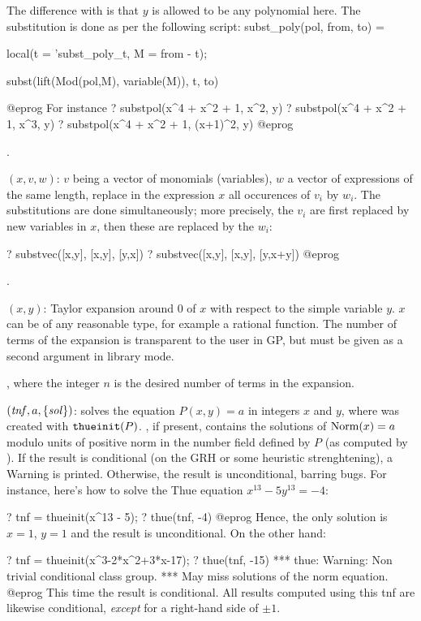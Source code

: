 The difference with  is that $y$ is allowed to be any polynomial
here. The substitution is done as per the following script:
\bprog
   subst_poly(pol, from, to) =
   { local(t = 'subst_poly_t, M = from - t);

     subst(lift(Mod(pol,M), variable(M)), t, to)
   }
@eprog\noindent
For instance
\bprog
? substpol(x^4 + x^2 + 1, x^2, y)
? substpol(x^4 + x^2 + 1, x^3, y)
? substpol(x^4 + x^2 + 1, (x+1)^2, y)
@eprog

.

$(x,v,w)$: $v$ being a vector of monomials (variables),
$w$ a vector of expressions of the same length, replace in the expression
$x$ all occurences of $v_i$ by $w_i$. The substitutions are done
simultaneously; more precisely, the $v_i$ are first replaced by new
variables in $x$, then these are replaced by the $w_i$:

\bprog
? substvec([x,y], [x,y], [y,x])
? substvec([x,y], [x,y], [y,x+y])
@eprog

.

$(x,y)$: Taylor expansion around $0$ of $x$ with respect
to\label{se:taylor}
the simple variable $y$. $x$ can be of any reasonable type, for example a
rational function. The number of terms of the expansion is transparent to the
user in GP, but must be given as a second argument in library mode.

, where the  integer $n$ is the desired number of
terms in the expansion.

$(\hbox{\it tnf\/},a,\{\hbox{\it sol\/}\})$: solves the equation
$P(x,y)=a$ in integers $x$ and $y$, where  was created with
${\tt thueinit}(P)$. , if present, contains the solutions of
${\rm Norm}(x)=a$ modulo units of positive norm in the number field
defined by $P$ (as computed by ). If the
result is conditional (on the GRH or some heuristic strenghtening),
a Warning is printed. Otherwise, the result is unconditional, barring bugs.
For instance, here's how to solve the Thue equation $x^{13} - 5y^{13} = - 4$:

\bprog
? tnf = thueinit(x^13 - 5);
? thue(tnf, -4)
@eprog
Hence, the only solution is $x = 1$, $y = 1$ and the result is
unconditional. On the other hand:

\bprog
? tnf = thueinit(x^3-2*x^2+3*x-17);
? thue(tnf, -15)
  *** thue: Warning: Non trivial conditional class group.
  *** May miss solutions of the norm equation.
@eprog
This time the result is conditional. All results computed using this tnf
are likewise conditional, \emph{except} for a right-hand side of $\pm 1$.

